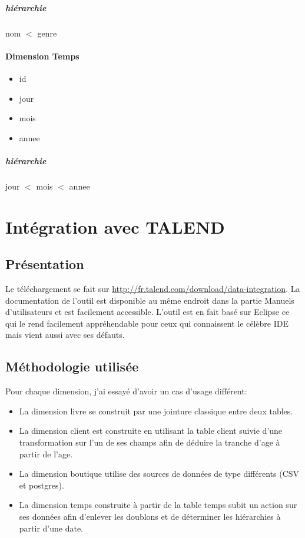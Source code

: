\subparagraph{hiérarchie}
nom $<$ genre

\paragraph{Dimension Temps}

\begin{itemize}
\item id
\item jour
\item mois
\item annee
\end{itemize}

\subparagraph{hiérarchie}
jour $<$ mois $<$ annee

\section{Intégration avec TALEND}

\subsection{Présentation}
Le téléchargement se fait sur \url{http://fr.talend.com/download/data-integration}.
La documentation de l'outil est disponible au même endroit dans la partie Manuels d'utilisateurs et est facilement accessible.
L'outil est en fait basé sur Eclipse ce qui le rend facilement appréhendable pour ceux qui connaissent le célèbre IDE mais vient aussi avec ses défauts.

\subsection{Méthodologie utilisée}

Pour chaque dimension, j'ai essayé d'avoir un cas d'usage différent:
\begin{itemize}
\item La dimension livre se construit par une jointure classique entre deux tables. 
\item La dimension client est construite en utilisant la table client suivie d'une transformation sur l'un de ses champs afin de déduire la tranche d'age à partir de l'age.
\item La dimension boutique utilise des sources de données de type différents (CSV et postgres).
\item La dimension temps construite à partir de la table temps subit un action sur ses données afin d'enlever les doublons et de déterminer les hiérarchies à partir d'une date.
\end{itemize}


